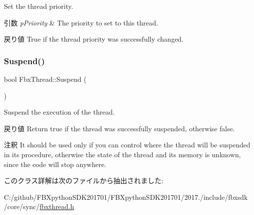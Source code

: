 Set the thread priority. 
\begin{DoxyParams}{引数}
{\em p\+Priority} & The priority to set to this thread. \\
\hline
\end{DoxyParams}
\begin{DoxyReturn}{戻り値}
True if the thread priority was successfully changed. 
\end{DoxyReturn}
\mbox{\label{class_fbx_thread_a41702b06399443c91e60c70be333d2a5}} 
\subsubsection{\texorpdfstring{Suspend()}{Suspend()}}
{\footnotesize\ttfamily bool Fbx\+Thread\+::\+Suspend (\begin{DoxyParamCaption}{ }\end{DoxyParamCaption})}

Suspend the execution of the thread. \begin{DoxyReturn}{戻り値}
Return true if the thread was successfully suspended, otherwise false. 
\end{DoxyReturn}
\begin{DoxyRemark}{注釈}
It should be used only if you can control where the thread will be suspended in its procedure, otherwise the state of the thread and its memory is unknown, since the code will stop anywhere. 
\end{DoxyRemark}


このクラス詳解は次のファイルから抽出されました\+:\begin{DoxyCompactItemize}
\item 
C\+:/github/\+F\+B\+Xpython\+S\+D\+K201701/\+F\+B\+Xpython\+S\+D\+K201701/2017./include/fbxsdk/core/sync/\hyperlink{fbxthread_8h}{fbxthread.\+h}\end{DoxyCompactItemize}
